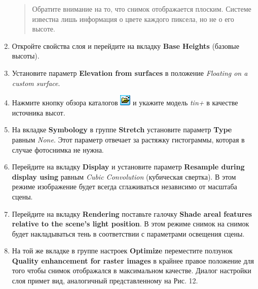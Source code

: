 \documentclass[12pt,]{book}
\begin{document}
\begin{enumerate}
  \begin{quote}
  Обратите внимание на то, что снимок отображается плоским. Системе известна лишь информация о цвете каждого пиксела, но не о его высоте.
  \end{quote}
\item
  Откройте свойства слоя и перейдите на вкладку \textbf{Base Heights} (базовые высоты).
\item
  Установите параметр \textbf{Elevation from surfaces} в положение \emph{Floating on a custom surface}.
\item
  Нажмите кнопку обзора каталогов \includegraphics{images/Ex18/image13.png} и укажите модель \emph{tin+} в качестве источника высот.
\item
  На вкладке \textbf{Symbology} в группе \textbf{Stretch} установите параметр \textbf{Type} равным \emph{None}. Этот параметр отвечает за растяжку гистограммы, которая в случае фотоснимка не нужна.
\item
  Перейдите на вкладку \textbf{Display} и установите параметр \textbf{Resample during display using} равным \emph{Cubic Convolution} (кубическая свертка). В этом режиме изображение будет всегда сглаживаться независимо от масштаба сцены.
\item
  Перейдите на вкладку \textbf{Rendering} поставьте галочку \textbf{Shade areal features relative to the scene's light position}. В этом режиме снимок на снимок будет накладываться тень в соответствии с параметрами освещения сцены.
\item
  На той же вкладке в группе настроек \textbf{Optimize} переместите ползунок \textbf{Quality enhancement for raster images} в крайнее правое положение для того чтобы снимок отображался в максимальном качестве. Диалог настройки слоя примет вид, аналогичный представленному на Рис. 12.


\end{enumerate}
\end{document}
